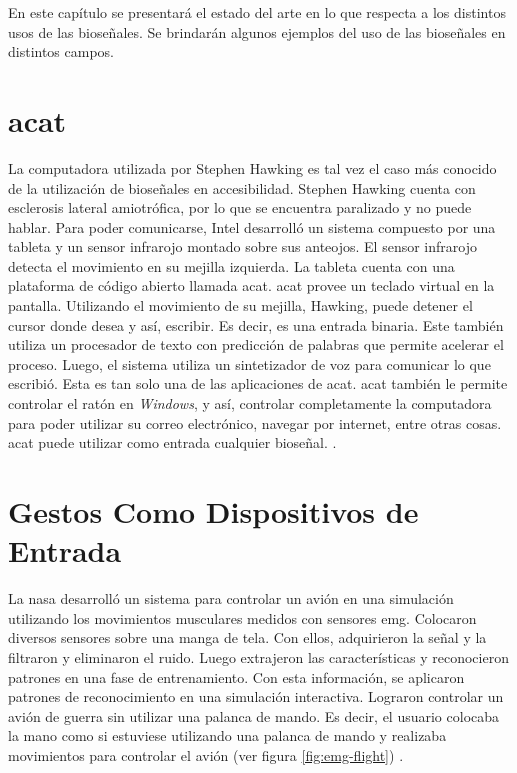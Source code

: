 En este capítulo se presentará el estado del arte en lo que respecta a los distintos usos de las bioseñales. Se brindarán algunos ejemplos del uso de las bioseñales en distintos campos.

\section{\acrshort{acat}}

La computadora utilizada por Stephen Hawking es tal vez el caso más conocido de la utilización de bioseñales en accesibilidad. Stephen Hawking cuenta con esclerosis lateral amiotrófica, por lo que se encuentra paralizado y no puede hablar. Para poder comunicarse, Intel desarrolló un sistema compuesto por una tableta y un sensor infrarojo montado sobre sus anteojos. El sensor infrarojo detecta el movimiento en su mejilla izquierda. La tableta cuenta con una plataforma de código abierto llamada \acrshort{acat}. \acrshort{acat} provee un teclado virtual en la pantalla. Utilizando el movimiento de su mejilla, Hawking, puede detener el cursor donde desea y así, escribir. Es decir, es una entrada binaria. Este también utiliza un procesador de texto con predicción de palabras que permite acelerar el proceso.  Luego, el sistema utiliza un sintetizador de voz para comunicar lo que escribió. Esta es tan solo una de las aplicaciones de \acrshort{acat}. \acrshort{acat} también le permite controlar el ratón en \emph{Windows}, y así, controlar completamente la computadora para poder utilizar su correo electrónico, navegar por internet, entre otras cosas. \acrshort{acat} puede utilizar como entrada cualquier bioseñal. \cite{hawking}.

\section{Gestos Como Dispositivos de Entrada}

La \acrshort{nasa} desarrolló un sistema para controlar un avión en una simulación utilizando los movimientos musculares medidos con sensores \acrshort{emg}. Colocaron diversos sensores sobre una manga de tela. Con ellos, adquirieron la señal y la filtraron y eliminaron el ruido. Luego extrajeron las características y reconocieron patrones en una fase de entrenamiento. Con esta información, se aplicaron patrones de reconocimiento en una simulación interactiva. Lograron controlar un avión de guerra sin utilizar una palanca de mando. Es decir, el usuario colocaba la mano como si estuviese utilizando una palanca de mando y realizaba movimientos para controlar el avión (ver figura \ref{fig:emg-flight}) \cite{emg-flight}.

